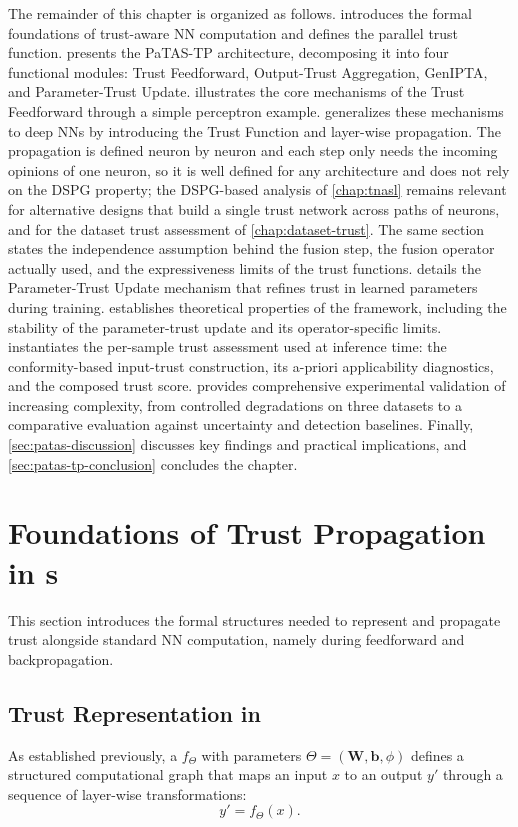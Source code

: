 The remainder of this chapter is organized as follows.  introduces the formal foundations of trust-aware \ac{NN} computation and defines the parallel trust function.  presents the \ac{PaTAS-TP} architecture, decomposing it into four functional modules: Trust Feedforward, Output-Trust Aggregation, \ac{GenIPTA}, and Parameter-Trust Update.  illustrates the core mechanisms of the Trust Feedforward through a simple perceptron example.  generalizes these mechanisms to deep \acp{NN} by introducing the Trust Function and layer-wise propagation. The propagation is defined neuron by neuron and each step only needs the incoming opinions of one neuron, so it is well defined for any architecture and does not rely on the \ac{DSPG} property; the \ac{DSPG}-based analysis of \cref{chap:tnasl} remains relevant for alternative designs that build a single trust network across paths of neurons, and for the dataset trust assessment of \cref{chap:dataset-trust}. The same section states the independence assumption behind the fusion step, the fusion operator actually used, and the expressiveness limits of the trust functions.  details the Parameter-Trust Update mechanism that refines trust in learned parameters during training.  establishes theoretical properties of the framework, including the stability of the parameter-trust update and its operator-specific limits.  instantiates the per-sample trust assessment used at inference time: the conformity-based input-trust construction, its a-priori applicability diagnostics, and the composed trust score.  provides comprehensive experimental validation of increasing complexity, from controlled degradations on three datasets to a comparative evaluation against uncertainty and detection baselines. Finally, \cref{sec:patas-discussion} discusses key findings and practical implications, and \cref{sec:patas-tp-conclusion} concludes the chapter.

\section{Foundations of Trust Propagation in s}
\label{sec:trust_foundations}
This section introduces the formal structures needed to represent and propagate trust alongside standard \ac{NN} computation, namely during feedforward and backpropagation.

\subsection{Trust Representation in }
As established previously, a  $f_\Theta$ with parameters $\Theta = (\mathbf{W}, \mathbf{b}, \phi)$ defines a structured computational graph that maps an input $x$ to an output $y'$ through a sequence of layer-wise transformations:
\[
y' = f_\Theta(x).
\]

